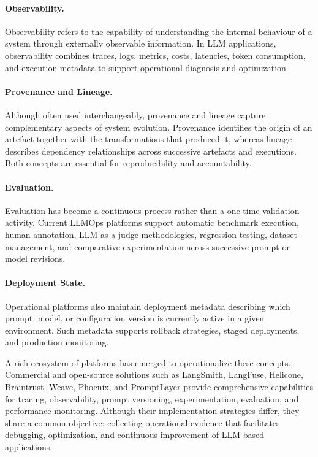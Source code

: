 \documentclass[10pt]{article}
\begin{document}
\paragraph{Observability.}
Observability refers to the capability of understanding the internal behaviour of a system through externally observable information. In LLM applications, observability combines traces, logs, metrics, costs, latencies, token consumption, and execution metadata to support operational diagnosis and optimization.

\paragraph{Provenance and Lineage.}
Although often used interchangeably, provenance and lineage capture complementary aspects of system evolution. Provenance identifies the origin of an artefact together with the transformations that produced it, whereas lineage describes dependency relationships across successive artefacts and executions. Both concepts are essential for reproducibility and accountability.

\paragraph{Evaluation.}
Evaluation has become a continuous process rather than a one-time validation activity. Current LLMOps platforms support automatic benchmark execution, human annotation, LLM-as-a-judge methodologies, regression testing, dataset management, and comparative experimentation across successive prompt or model revisions.

\paragraph{Deployment State.}
Operational platforms also maintain deployment metadata describing which prompt, model, or configuration version is currently active in a given environment. Such metadata supports rollback strategies, staged deployments, and production monitoring.

A rich ecosystem of platforms has emerged to operationalize these concepts. Commercial and open-source solutions such as LangSmith, LangFuse, Helicone, Braintrust, Weave, Phoenix, and PromptLayer provide comprehensive capabilities for tracing, observability, prompt versioning, experimentation, evaluation, and performance monitoring. Although their implementation strategies differ, they share a common objective: collecting operational evidence that facilitates debugging, optimization, and continuous improvement of LLM-based applications.
\end{document}
